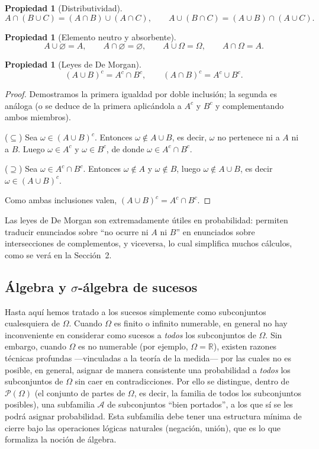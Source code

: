 \documentclass[11pt,a4paper]{article}
\theoremstyle{plain}
\newtheorem{propiedad}[teorema]{Propiedad}
\theoremstyle{definition}
\theoremstyle{remark}
\begin{document}
\begin{propiedad}[Distributividad]
\[
A\cap(B\cup C)=(A\cap B)\cup(A\cap C), \qquad A\cup(B\cap C)=(A\cup B)\cap(A\cup C).
\]
\end{propiedad}

\begin{propiedad}[Elemento neutro y absorbente]
\[
A\cup \varnothing = A, \qquad A\cap \varnothing = \varnothing, \qquad A\cup \Omega = \Omega, \qquad A\cap \Omega = A.
\]
\end{propiedad}

\begin{propiedad}[Leyes de De Morgan]
\[
(A\cup B)^c = A^c \cap B^c, \qquad (A\cap B)^c = A^c \cup B^c.
\]
\end{propiedad}

\begin{proof}
Demostramos la primera igualdad por doble inclusión; la segunda es análoga (o se deduce de la primera aplicándola a $A^c$ y $B^c$ y complementando ambos miembros).

($\subseteq$) Sea $\omega \in (A\cup B)^c$. Entonces $\omega \notin A\cup B$, es decir, $\omega$ no pertenece ni a $A$ ni a $B$. Luego $\omega \in A^c$ y $\omega \in B^c$, de donde $\omega \in A^c \cap B^c$.

($\supseteq$) Sea $\omega \in A^c \cap B^c$. Entonces $\omega \notin A$ y $\omega \notin B$, luego $\omega \notin A \cup B$, es decir $\omega \in (A\cup B)^c$.

Como ambas inclusiones valen, $(A\cup B)^c = A^c \cap B^c$.
\end{proof}

Las leyes de De Morgan son extremadamente útiles en probabilidad: permiten traducir enunciados sobre ``no ocurre ni $A$ ni $B$'' en enunciados sobre intersecciones de complementos, y viceversa, lo cual simplifica muchos cálculos, como se verá en la Sección~2.

\subsection{Álgebra y \texorpdfstring{$\sigma$}{sigma}-álgebra de sucesos}

Hasta aquí hemos tratado a los sucesos simplemente como subconjuntos cualesquiera de $\Omega$. Cuando $\Omega$ es finito o infinito numerable, en general no hay inconveniente en considerar como sucesos a \emph{todos} los subconjuntos de $\Omega$. Sin embargo, cuando $\Omega$ es no numerable (por ejemplo, $\Omega=\mathbb{R}$), existen razones técnicas profundas —vinculadas a la teoría de la medida— por las cuales no es posible, en general, asignar de manera consistente una probabilidad a \emph{todos} los subconjuntos de $\Omega$ sin caer en contradicciones. Por ello se distingue, dentro de $\mathcal{P}(\Omega)$ (el conjunto de partes de $\Omega$, es decir, la familia de todos los subconjuntos posibles), una subfamilia $\mathcal{A}$ de subconjuntos ``bien portados'', a los que sí se les podrá asignar probabilidad. Esta subfamilia debe tener una estructura mínima de cierre bajo las operaciones lógicas naturales (negación, unión), que es lo que formaliza la noción de álgebra.
\end{document}
